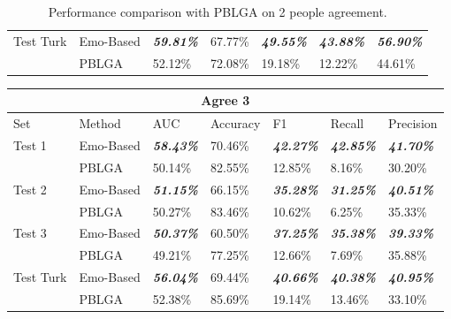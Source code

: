 \documentclass[12pt,a4paper]{report}
\theoremstyle{definition}
\begin{document}
\begin{CJK}{UTF8}{bsmi}
\begin{table}[H]
\begin{tabular}{l | l | l | l | l | l | l}
                \hline
                Test Turk & Emo-Based & \textit{\textbf{59.81\%}} & 67.77\% & \textit{\textbf{49.55\%}} & \textit{\textbf{43.88\%}} & \textit{\textbf{56.90\%}}\\
                 & PBLGA & 52.12\% & 72.08\% & 19.18\% & 12.22\% & 44.61\%\\
                
                \hline
            \end{tabular}
            \caption{Performance comparison with PBLGA on 2 people agreement.}
            \label{tab:pblga_agree2}
        \end{table}
        \begin{table}[H]
            \centering
            \begin{tabular}{l | l | l | l | l | l | l}
                \hline
                \multicolumn{7}{c}{\textbf{Agree 3}} \\
                \hline
                Set & Method & AUC & Accuracy & F1 & Recall & Precision \\
                \hline \hline
                Test 1 & Emo-Based & \textit{\textbf{58.43\%}} & 70.46\% & \textit{\textbf{42.27\%}} & \textit{\textbf{42.85\%}} & \textit{\textbf{41.70\%}}\\
                 & PBLGA & 50.14\% & 82.55\% & 12.85\% & 8.16\% & 30.20\%\\
                
                \hline
                Test 2 & Emo-Based & \textit{\textbf{51.15\%}} & 66.15\% & \textit{\textbf{35.28\%}} & \textit{\textbf{31.25\%}} & \textit{\textbf{40.51\%}}\\
                 & PBLGA & 50.27\% & 83.46\% & 10.62\% & 6.25\% & 35.33\%\\
                
                \hline
                Test 3 & Emo-Based & \textit{\textbf{50.37\%}} & 60.50\% & \textit{\textbf{37.25\%}} & \textit{\textbf{35.38\%}} & \textit{\textbf{39.33\%}}\\
                 & PBLGA & 49.21\% & 77.25\% & 12.66\% & 7.69\% & 35.88\%\\
                
                \hline
                Test Turk & Emo-Based & \textit{\textbf{56.04\%}} & 69.44\% & \textit{\textbf{40.66\%}} & \textit{\textbf{40.38\%}} & \textit{\textbf{40.95\%}}\\
                 & PBLGA & 52.38\% & 85.69\% & 19.14\% & 13.46\% & 33.10\%\\
                

\end{tabular}
\end{table}
\end{CJK}
\end{document}
